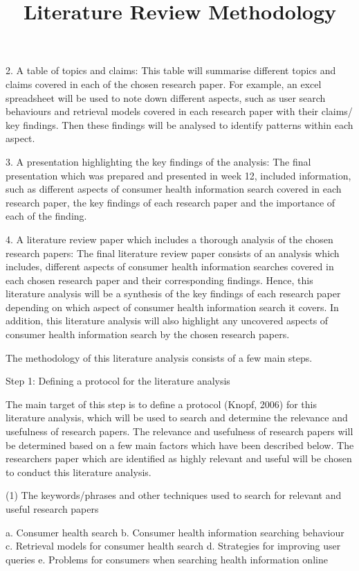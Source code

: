 \documentclass[]{article}
\begin{document}
2.	A table of topics and claims: This table will summarise different topics and claims covered in each of the chosen research paper. For example, an excel spreadsheet will be used to note down different aspects, such as user search behaviours and retrieval models covered in each research paper with their claims/ key findings. Then these findings will be analysed to identify patterns within each aspect.  

3.	A presentation highlighting the key findings of the analysis: The final presentation which was prepared and presented in week 12, included information, such as different aspects of consumer health information search covered in each research paper, the key findings of each research paper and the importance of each of the finding.  

4.	A literature review paper which includes a thorough analysis of the chosen research papers: The final literature review paper consists of an analysis which includes, different aspects of consumer health information searches covered in each chosen research paper and their corresponding findings. Hence, this literature analysis will be a synthesis of the key findings of each research paper depending on which aspect of consumer health information search it covers. In addition, this literature analysis will also highlight any uncovered aspects of consumer health information search by the chosen research papers.

\title{Literature Review Methodology}  

The methodology of this literature analysis consists of a few main steps.

Step 1: Defining a protocol for the literature analysis

The main target of this step is to define a protocol (Knopf, 2006) for this literature analysis, which will be used to search and determine the relevance and usefulness of research papers. The relevance and usefulness of research papers will be determined based on a few main factors which have been described below. The researchers paper which are identified as highly relevant and useful will be chosen to conduct this literature analysis. 

(1)	The keywords/phrases and other techniques used to search for relevant and useful research papers 

a. Consumer health search
b. Consumer health information searching behaviour
c. Retrieval models for consumer health search
d. Strategies for improving user queries 
e. Problems for consumers when searching health information online
\end{document}
